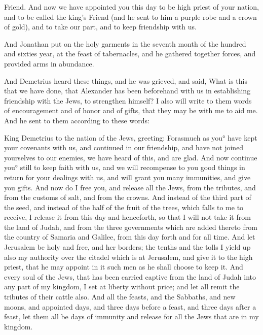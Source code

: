 { Friend.
And now we have appointed you this day to be high priest of your nation, and to be called the king’s
 Friend (and he sent to him a purple robe and a crown of gold), and to take our part, and to keep friendship with us.
\par }{\PP {}And Jonathan put on the holy garments in the seventh month of
 the hundred and sixties year, at the feast of tabernacles, and he gathered together forces, and provided arms in abundance.
\par }{\PP {}And Demetrius heard these things, and he was grieved, and said,
What is this that we have done, that Alexander has been beforehand with us in establishing friendship with the Jews, to strengthen himself?
I also will write to them words of encouragement and of honor and of gifts, that they may be with me to aid me.
And he sent to them according to these words:
\par }{\PP King Demetrius to the nation of the Jews, greeting:
Forasmuch as you° have kept your covenants with us, and continued in our friendship, and have not joined yourselves to our enemies, we have heard of this, and are glad.
And now continue you° still to keep faith with us, and we will recompense to you good things in return for your dealings with us,
and will grant you many immunities, and give you gifts.
And now do I free you, and release all the Jews, from the tributes, and from the customs of salt, and from the crowns.
And instead of the third part of the seed, and instead of the half of the fruit of the trees, which falls to me to receive, I release it from this day and henceforth, so that I will not take it from the land of Judah, and from the three governments which are added thereto from the country of Samaria and Galilee, from this day forth and for all time.
And let Jerusalem be holy and free, and her borders; the tenths and the tolls
{}
I yield up also my authority over the citadel which is at Jerusalem, and give it to the high priest, that he may appoint in it such men as he shall choose to keep it.
And every soul of the Jews, that has been carried captive from the land of Judah into any part of my kingdom, I set at liberty without price; and let all remit the tributes of their cattle also.
And all the feasts, and the Sabbaths, and new moons, and appointed days, and three days before a feast, and three days after a feast, let them all be days of immunity and release for all the Jews that are in my kingdom.
}
